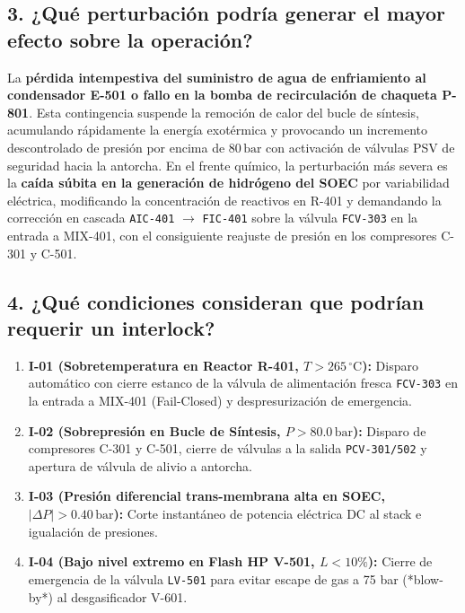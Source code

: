 \documentclass[10pt,letterpaper]{article}
\begin{document}
\subsection*{3. ¿Qué perturbación podría generar el mayor efecto sobre la operación?}
La \textbf{pérdida intempestiva del suministro de agua de enfriamiento al condensador E-501 o fallo en la bomba de recirculación de chaqueta P-801}. Esta contingencia suspende la remoción de calor del bucle de síntesis, acumulando rápidamente la energía exotérmica y provocando un incremento descontrolado de presión por encima de $80\,\text{bar}$ con activación de válvulas PSV de seguridad hacia la antorcha. En el frente químico, la perturbación más severa es la \textbf{caída súbita en la generación de hidrógeno del SOEC} por variabilidad eléctrica, modificando la concentración de reactivos en R-401 y demandando la corrección en cascada \texttt{AIC-401} $\to$ \texttt{FIC-401} sobre la válvula \texttt{FCV-303} en la entrada a MIX-401, con el consiguiente reajuste de presión en los compresores C-301 y C-501.

\subsection*{4. ¿Qué condiciones consideran que podrían requerir un interlock?}
\begin{enumerate}
    \item \textbf{I-01 (Sobretemperatura en Reactor R-401, $T > 265\,^\circ\text{C}$):} Disparo automático con cierre estanco de la válvula de alimentación fresca \texttt{FCV-303} en la entrada a MIX-401 (Fail-Closed) y despresurización de emergencia.
    \item \textbf{I-02 (Sobrepresión en Bucle de Síntesis, $P > 80.0\,\text{bar}$):} Disparo de compresores C-301 y C-501, cierre de válvulas a la salida \texttt{PCV-301/502} y apertura de válvula de alivio a antorcha.
    \item \textbf{I-03 (Presión diferencial trans-membrana alta en SOEC, $|\Delta P| > 0.40\,\text{bar}$):} Corte instantáneo de potencia eléctrica DC al stack e igualación de presiones.
    \item \textbf{I-04 (Bajo nivel extremo en Flash HP V-501, $L < 10\%$):} Cierre de emergencia de la válvula \texttt{LV-501} para evitar escape de gas a 75 bar (*blow-by*) al desgasificador V-601.
\end{enumerate}
\end{document}

